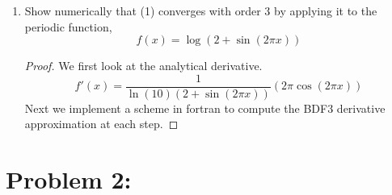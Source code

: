 \documentclass{article}
\begin{document}
\begin{enumerate}
    
    \item Show numerically that (1) converges with order 3 by applying it to the periodic
function, 
        \[
            f(x) = \log(2 + \sin(2\pi x))
        \]
    \begin{proof}
    
        We first look at the analytical derivative. 
        \[
            f'(x) = \frac{1}{\ln(10)(2 + \sin(2\pi x))}(2\pi\cos(2\pi x))
        \]
        Next we implement a scheme in fortran to compute the BDF3 derivative approximation at each step.
        
    \end{proof}
        

\end{enumerate}


\section*{Problem 2: }
\end{document}
